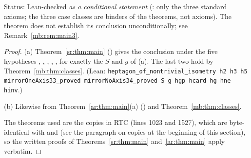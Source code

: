 Status: Lean-checked \emph{as a conditional statement} (: only the three standard axioms;
the three case classes are binders of the theorems, not axioms). The theorem does not establish its conclusion
unconditionally; see Remark~\ref{mb:rem:main3}.

\begin{proof}
(a) Theorem~\ref{sr:thm:main} () gives the conclusion under the five hypotheses
, , , , , for exactly the
$S$ and $g$ of (a). The last two hold by Theorem~\ref{mb:thm:classes}. (Lean: \texttt{heptagon\_of\_nontrivial\_isometry
h2 h3 h5 mirrorOneAxis33\_proved mirrorNoAxis34\_proved S g hgp hcard hg hne hinv}.)

(b) Likewise from Theorem~\ref{ar:thm:main}(a) () and Theorem~\ref{mb:thm:classes}.

The theorems used are the copies in RTC (lines 1023 and 1527), which are byte-identical with
 and  (see the paragraph on copies at
the beginning of this section), so the written proofs of Theorems~\ref{sr:thm:main} and~\ref{ar:thm:main} apply
verbatim.
\end{proof}

